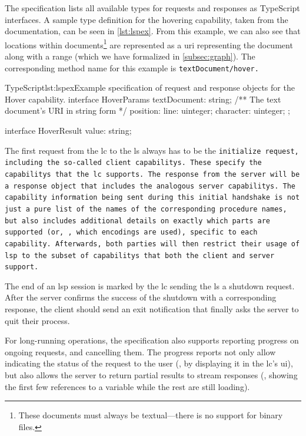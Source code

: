 \documentclass[../thesis]{subfiles}
\begin{document}
The specification lists all available types for requests and responses as TypeScript interfaces.
A sample type definition for the hovering \gls{capability}, taken from the documentation, can be seen in \cref{lst:lspex}.
From this example, we can also see that locations within documents\footnote{
	These documents must always be textual---there is no support for binary files.
} are represented as a \gls*{uri} representing the document along with a \gls{range} (which we have formalized in \cref{subsec:graph}).
The corresponding method name for this example is \tt{textDocument/hover}.

\begin{codebox}{TypeScript}{lst:lspex}{Example specification of request and response objects for the Hover {capability}.}
interface HoverParams {
  textDocument: string; /** The text document's URI in string form */
  position: { line: uinteger; character: uinteger; };
}

interface HoverResult {
  value: string;
}
\end{codebox}\label{lst:lspex}

The first request from the \gls{lc} to the \gls{ls} always has to be the \tt{initialize} request, including the so-called client \glspl{capability}.
These specify the \glspl{capability} that the \gls{lc} supports.
The response from the server will be a response object that includes the analogous server \glspl{capability}.
The \gls{capability} information being sent during this initial handshake is not just a pure list of the names of the corresponding procedure names, but also includes additional details on exactly which parts are supported (or, \eg, which encodings are used), specific to each \gls{capability}.
Afterwards, both parties will then restrict their usage of \gls{lsp} to the subset of \glspl{capability} that both the client and server support.

The end of an \gls{lsp} session is marked by the \gls{lc} sending the \gls{ls} a shutdown request.
After the server confirms the success of the shutdown with a corresponding response, the client should send an exit notification that finally asks the server to quit their process.

For long-running operations, the specification also supports reporting progress on ongoing requests, and cancelling them.
The progress reports not only allow indicating the status of the request to the user (\eg, by displaying it in the \gls{lc}'s \gls{ui}), but also allows the server to return partial results to stream responses (\eg, showing the first few references to a variable while the rest are still loading).
\end{document}
